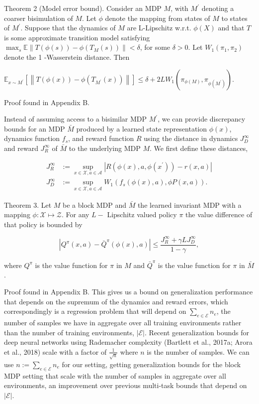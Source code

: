 \documentclass[10pt]{article}
\begin{document}
Theorem 2 (Model error bound). Consider an MDP $M$, with $M^{\prime}$ denoting a coarser bisimulation of $M$. Let $\phi$ denote the mapping from states of $M$ to states of $M^{\prime}$. Suppose that the dynamics of $M$ are L-Lipschitz w.r.t. $\phi(X)$ and that $T$ is some approximate transition model satisfying $\max _{s} \mathbb{E}\left\|T(\phi(s))-\phi\left(T_{M}(s)\right)\right\|<\delta$, for some $\delta>0$. Let $W_{1}\left(\pi_{1}, \pi_{2}\right)$ denote the 1 -Wasserstein distance. Then

$\mathbb{E}_{x \sim M^{\prime}}\left[\left\|T(\phi(x))-\phi\left(T_{M^{\prime}}(x)\right)\right\|\right] \leq \delta+2 L W_{1}\left(\pi_{\phi(M)}, \pi_{\phi\left(M^{\prime}\right)}\right)$.

Proof found in Appendix B.

Instead of assuming access to a bisimilar MDP $M^{\prime}$, we can provide discrepancy bounds for an MDP $\bar{M}$ produced by a learned state representation $\phi(x)$, dynamics function $f_{s}$, and reward function $R$ using the distance in dynamics $J_{D}^{\infty}$ and reward $J_{R}^{\infty}$ of $\bar{M}$ to the underlying MDP $M$. We first define these distances,

\[
\begin{aligned}
J_{R}^{\infty} & :=\sup _{x \in \mathcal{X}, a \in \mathcal{A}}\left|R\left(\phi(x), a, \phi\left(x^{\prime}\right)\right)-r(x, a)\right| \\
J_{D}^{\infty} & :=\sup _{x \in \mathcal{X}, a \in \mathcal{A}} W_{1}\left(f_{s}(\phi(x), a), \phi P(x, a)\right) .
\end{aligned}
\]

Theorem 3. Let $M$ be a block MDP and $\bar{M}$ the learned invariant MDP with a mapping $\phi: \mathcal{X} \mapsto \mathcal{Z}$. For any $L-$ Lipschitz valued policy $\pi$ the value difference of that policy is bounded by

\[
\left|Q^{\pi}(x, a)-\bar{Q}^{\pi}(\phi(x), a)\right| \leq \frac{J_{R}^{\infty}+\gamma L J_{D}^{\infty}}{1-\gamma},
\]

where $Q^{\pi}$ is the value function for $\pi$ in $M$ and $\bar{Q}^{\pi}$ is the value function for $\pi$ in $\bar{M}$.

Proof found in Appendix B. This gives us a bound on generalization performance that depends on the supremum of the dynamics and reward errors, which correspondingly is a regression problem that will depend on $\sum_{e \in \mathcal{E}} n_{e}$, the number of samples we have in aggregate over all training environments rather than the number of training environments, $|\mathcal{E}|$. Recent generalization bounds for deep neural networks using Rademacher complexity (Bartlett et al., 2017a; Arora et al., 2018) scale with a factor of $\frac{1}{\sqrt{n}}$ where $n$ is the number of samples. We can use $n:=\sum_{e \in \mathcal{E}} n_{e}$ for our setting, getting generalization bounds for the block MDP setting that scale with the number of samples in aggregate over all environments, an improvement over previous multi-task bounds that depend on $|\mathcal{E}|$.
\end{document}
